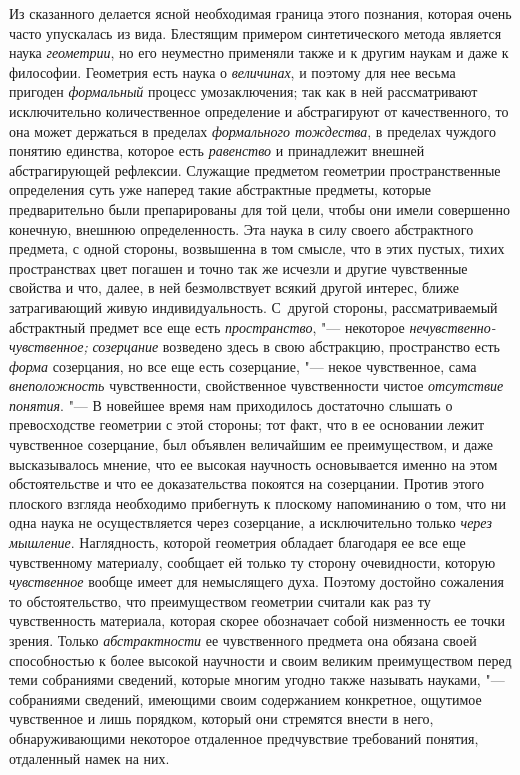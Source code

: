 Из сказанного делается ясной необходимая граница этого
познания, которая очень часто упускалась из вида. Блестящим примером
синтетического метода является наука
{\em геометрии}, но его
неуместно применяли также и к другим наукам и даже к философии. Геометрия
есть наука о {\em величинах},
и поэтому для нее весьма пригоден
{\em формальный} процесс
умозаключения; так как в ней рассматривают исключительно
количественное определение и абстрагируют от качественного, то она может
держаться в пределах {\em формального
тождества}, в пределах чуждого понятию единства, которое
есть {\em равенство} и
принадлежит внешней абстрагирующей рефлексии. Служащие предметом геометрии
пространственные определения суть уже наперед такие абстрактные предметы,
которые предварительно были препарированы для той цели, чтобы они имели
совершенно конечную, внешнюю определенность. Эта наука в силу своего
абстрактного предмета, с одной стороны, возвышенна в том смысле, что в этих
пустых, тихих пространствах цвет погашен и точно так же исчезли и другие
чувственные свойства и что, далее, в ней безмолвствует всякий другой
интерес, ближе затрагивающий живую индивидуальность. С~другой стороны,
рассматриваемый абстрактный предмет все еще есть
{\em пространство}, "---
некоторое
{\em нечувственно-чувственное;}
{\em созерцание} возведено
здесь в свою абстракцию, пространство есть
{\em форма} созерцания,
но все еще есть созерцание, "--- некое чувственное, сама
{\em внеположность}
чувственности, свойственное чувственности чистое
{\em отсутствие понятия}. "---
В новейшее время нам приходилось достаточно слышать о
превосходстве геометрии с этой стороны; тот факт, что в ее основании лежит
чувственное созерцание, был объявлен величайшим ее преимуществом, и даже
высказывалось мнение, что ее высокая научность основывается именно на этом
обстоятельстве и что ее доказательства покоятся на
созерцании.
Против этого плоского взгляда необходимо прибегнуть к
плоскому напоминанию о том, что ни одна наука не осуществляется через
созерцание, а исключительно только
{\em через мышление}.
Наглядность, которой геометрия обладает благодаря ее все еще
чувственному материалу, сообщает ей только ту сторону очевидности, которую
{\em чувственное} вообще
имеет для немыслящего духа. Поэтому достойно сожаления то обстоятельство,
что преимуществом геометрии считали как раз ту чувственность материала,
которая скорее обозначает собой низменность ее точки зрения. Только
{\em абстрактности} ее
чувственного предмета она обязана своей способностью к более высокой
научности и своим великим преимуществом перед теми собраниями сведений,
которые многим угодно также называть науками, "--- собраниями
сведений, имеющими своим содержанием конкретное, ощутимое чувственное и
лишь порядком, который они стремятся внести в него, обнаруживающими
некоторое отдаленное предчувствие требований понятия, отдаленный намек на
них.

